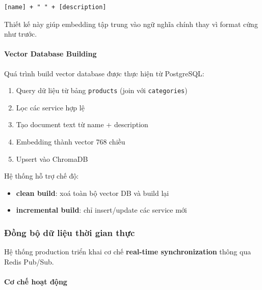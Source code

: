 \begin{verbatim}
[name] + " " + [description]
\end{verbatim}

Thiết kế này giúp embedding tập trung vào ngữ nghĩa chính thay vì format cứng như trước.

\paragraph{Vector Database Building} 

Quá trình build vector database được thực hiện từ PostgreSQL:

\begin{enumerate}
    \item Query dữ liệu từ bảng \texttt{products} (join với \texttt{categories})
    \item Lọc các service hợp lệ
    \item Tạo document text từ name + description
    \item Embedding thành vector 768 chiều
    \item Upsert vào ChromaDB
\end{enumerate}

Hệ thống hỗ trợ chế độ:

\begin{itemize}
    \item \textbf{clean build}: xoá toàn bộ vector DB và build lại
    \item \textbf{incremental build}: chỉ insert/update các service mới
\end{itemize}

\subsubsection{Đồng bộ dữ liệu thời gian thực}

Hệ thống production triển khai cơ chế \textbf{real-time synchronization} thông qua Redis Pub/Sub.

\paragraph{Cơ chế hoạt động}

